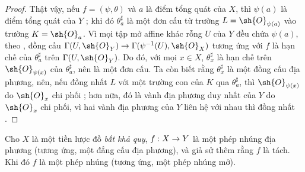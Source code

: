 \documentclass[oneside]{amsart}
\makeatletter
\newcommand{\ega@arrow}[2]{\mathchoice{#1}{#2}{#2}{#2}}
\renewcommand{\to}{\ega@arrow{\longrightarrow}{\rightarrow}}
\let\EGAOriginalLabel\label
\renewcommand{\label}[1]{\phantomsection\EGAOriginalLabel{#1}}
\makeatother
\begin{document}
\begin{proof}
Thật vậy, nếu $f=(\psi,\theta)$ và $a$ là điểm tổng quát của $X$, thì $\psi(a)$ là điểm tổng quát của $Y$ ;
khi đó $\theta_a^\sharp$ là một đơn cấu từ trường $L=\sh{O}_{\psi(a)}$ vào trường $K=\sh{O}_a$.
Vì mọi tập mở affine khác rỗng $U$ của $Y$ đều chứa $\psi(a)$, theo , đồng cấu $\Gamma(U,\sh{O}_Y)\to\Gamma(\psi^{-1}(U),\sh{O}_X)$ tương ứng với $f$ là hạn chế của $\theta_a^\sharp$ trên $\Gamma(U,\sh{O}_Y)$.
Do đó, với mọi $x\in X$, $\theta_x^\sharp$ là hạn chế trên $\sh{O}_{\psi(x)}$ của $\theta_a^\sharp$, nên là một đơn cấu.
Ta còn biết rằng $\theta_x^\sharp$ là một đồng cấu địa phương, nên, nếu đồng nhất $L$ với một trường con của $K$ qua $\theta_a^\sharp$, thì $\sh{O}_{\psi(x)}$ do $\sh{O}_x$ chi phối ;
hơn nữa, đó là vành địa phương duy nhất của $Y$ do $\sh{O}_x$ chi phối, vì hai vành địa phương của $Y$ liên hệ với nhau thì đồng nhất .
\end{proof}

\begin{proposition}[8.2.8]
\label{I.8.2.8}
Cho $X$ là một tiền lược đồ \emph{bất khả quy}, $f:X\to Y$ là một phép nhúng địa phương (tương ứng, một đẳng cấu địa phương), và giả sử thêm rằng $f$ là tách. Khi đó $f$ là một phép nhúng (tương ứng, một phép nhúng mở).
\end{proposition}
\end{document}
